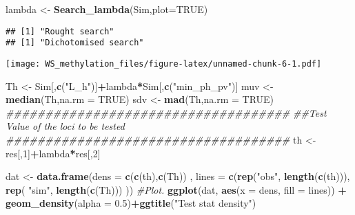 \documentclass[
]{article}
\newenvironment{Shaded}{\begin{snugshade}}{\end{snugshade}}
\newcommand{\CommentTok}[1]{\textcolor[rgb]{0.56,0.35,0.01}{\textit{#1}}}
\newcommand{\DataTypeTok}[1]{\textcolor[rgb]{0.13,0.29,0.53}{#1}}
\newcommand{\DecValTok}[1]{\textcolor[rgb]{0.00,0.00,0.81}{#1}}
\newcommand{\FloatTok}[1]{\textcolor[rgb]{0.00,0.00,0.81}{#1}}
\newcommand{\KeywordTok}[1]{\textcolor[rgb]{0.13,0.29,0.53}{\textbf{#1}}}
\newcommand{\NormalTok}[1]{#1}
\newcommand{\OperatorTok}[1]{\textcolor[rgb]{0.81,0.36,0.00}{\textbf{#1}}}
\newcommand{\OtherTok}[1]{\textcolor[rgb]{0.56,0.35,0.01}{#1}}
\newcommand{\StringTok}[1]{\textcolor[rgb]{0.31,0.60,0.02}{#1}}
\begin{document}
\begin{Shaded}
\begin{Highlighting}[]
\NormalTok{lambda <-}\StringTok{ }\KeywordTok{Search_lambda}\NormalTok{(Sim,}\DataTypeTok{plot=}\OtherTok{TRUE}\NormalTok{)}
\end{Highlighting}
\end{Shaded}

\begin{verbatim}
## [1] "Rought search"
## [1] "Dichotomised search"
\end{verbatim}

\texttt{[image: WS\_methylation\_files/figure-latex/unnamed-chunk-6-1.pdf]}

\begin{Shaded}
\begin{Highlighting}[]
\NormalTok{Th <-}\StringTok{ }\NormalTok{Sim[,}\KeywordTok{c}\NormalTok{(}\StringTok{"L_h"}\NormalTok{)]}\OperatorTok{+}\NormalTok{lambda}\OperatorTok{*}\NormalTok{Sim[,}\KeywordTok{c}\NormalTok{(}\StringTok{"min_ph_pv"}\NormalTok{)]}
\NormalTok{muv <-}\StringTok{ }\KeywordTok{median}\NormalTok{(Th,}\DataTypeTok{na.rm =} \OtherTok{TRUE}\NormalTok{)}
\NormalTok{sdv <-}\StringTok{ }\KeywordTok{mad}\NormalTok{(Th,}\DataTypeTok{na.rm =} \OtherTok{TRUE}\NormalTok{)}
\CommentTok{####################################}
\CommentTok{##Test Value of the loci to be tested}
\CommentTok{####################################}
\NormalTok{th <-}\StringTok{  }\NormalTok{res[,}\DecValTok{1}\NormalTok{]}\OperatorTok{+}\NormalTok{lambda}\OperatorTok{*}\NormalTok{res[,}\DecValTok{2}\NormalTok{]}

\NormalTok{dat <-}\StringTok{ }\KeywordTok{data.frame}\NormalTok{(}\DataTypeTok{dens =} \KeywordTok{c}\NormalTok{(}\KeywordTok{c}\NormalTok{(th),}\KeywordTok{c}\NormalTok{(Th))}
\NormalTok{                  , }\DataTypeTok{lines =} \KeywordTok{c}\NormalTok{(}\KeywordTok{rep}\NormalTok{(}\StringTok{"obs"}\NormalTok{, }\KeywordTok{length}\NormalTok{(}\KeywordTok{c}\NormalTok{(th))), }\KeywordTok{rep}\NormalTok{( }\StringTok{"sim"}\NormalTok{, }\KeywordTok{length}\NormalTok{(}\KeywordTok{c}\NormalTok{(Th))) ))}
\CommentTok{#Plot.}
\KeywordTok{ggplot}\NormalTok{(dat, }\KeywordTok{aes}\NormalTok{(}\DataTypeTok{x =}\NormalTok{ dens, }\DataTypeTok{fill =}\NormalTok{ lines)) }\OperatorTok{+}\StringTok{ }\KeywordTok{geom_density}\NormalTok{(}\DataTypeTok{alpha =} \FloatTok{0.5}\NormalTok{)}\OperatorTok{+}\KeywordTok{ggtitle}\NormalTok{(}\StringTok{"Test stat density"}\NormalTok{)}
\end{Highlighting}
\end{Shaded}
\end{document}
